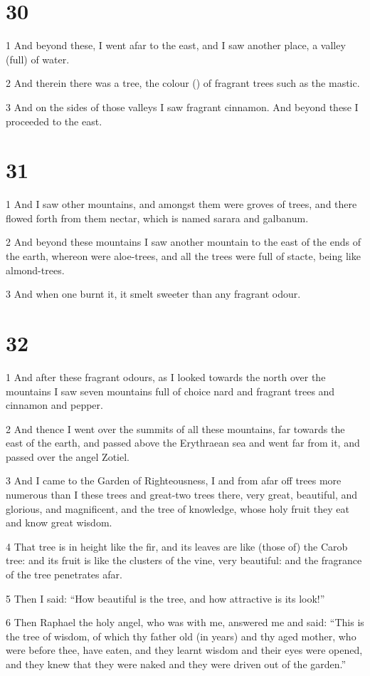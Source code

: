 \chapter{30}

\par 1 And beyond these, I went afar to the east, and I saw another place, a valley (full) of water.
\par 2 And therein there was a tree, the colour () of fragrant trees such as the mastic.
\par 3 And on the sides of those valleys I saw fragrant cinnamon. And beyond these I proceeded to the east.

\chapter{31}

\par 1 And I saw other mountains, and amongst them were groves of trees, and there flowed forth from them nectar, which is named sarara and galbanum.
\par 2 And beyond these mountains I saw another mountain to the east of the ends of the earth, whereon were aloe-trees, and all the trees were full of stacte, being like almond-trees.
\par 3 And when one burnt it, it smelt sweeter than any fragrant odour.

\chapter{32}

\par 1 And after these fragrant odours, as I looked towards the north over the mountains I saw seven mountains full of choice nard and fragrant trees and cinnamon and pepper.
\par 2 And thence I went over the summits of all these mountains, far towards the east of the earth, and passed above the Erythraean sea and went far from it, and passed over the angel Zotiel.
\par 3 And I came to the Garden of Righteousness, I and from afar off trees more numerous than I these trees and great-two trees there, very great, beautiful, and glorious, and magnificent, and the tree of knowledge, whose holy fruit they eat and know great wisdom.
\par 4 That tree is in height like the fir, and its leaves are like (those of) the Carob tree: and its fruit is like the clusters of the vine, very beautiful: and the fragrance of the tree penetrates afar.
\par 5 Then I said: “How beautiful is the tree, and how attractive is its look!”
\par 6 Then Raphael the holy angel, who was with me, answered me and said: “This is the tree of wisdom, of which thy father old (in years) and thy aged mother, who were before thee, have eaten, and they learnt wisdom and their eyes were opened, and they knew that they were naked and they were driven out of the garden.”

